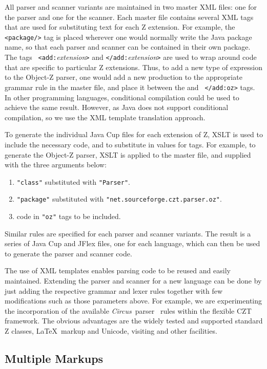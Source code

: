 \documentclass{llncs}
\newcommand{\Circus}{{\sf\slshape Circus}}
\begin{document}
All parser and scanner variants are maintained in two master XML
files: one for the parser and one for the scanner. Each master file
contains several XML tags that are used for substituting text for each
Z extension. For example, the {\tt <package/>} tag is placed wherever
one would normally write the Java package name, so that each parser
and scanner can be contained in their own package. The tags {\tt
<add:}{\em extension}{\tt >} and {\tt </add:}{\em extension}{\tt >}
are used to wrap around code that are specific to particular Z
extensions. Thus, to add a new type of expression to the Object-Z parser,
one would add a new production to the appropriate grammar rule in the
master file, and place it between the {\tt <add:oz>} and {\tt
</add:oz>} tags. In other programming languages, conditional compilation
could be used to achieve the same result. However, as Java does not
support conditional compilation, so we use the XML template translation
approach.

To generate the individual Java Cup files for each extension of Z,
XSLT is used to include the necessary code, and to substitute in
values for tags. For example, to generate the Object-Z parser, XSLT is
applied to the master file, and supplied with the three arguments
below:
\begin{enumerate}
  \item {\tt "class"} substituted with {\tt "Parser"}.
  \item {\tt "package"} substituted with {\tt "net.sourceforge.czt.parser.oz"}.
  \item code in {\tt "oz"} tags to be included.
\end{enumerate}

Similar rules are specified for each parser and scanner variants. The
result is a series of Java Cup and JFlex files, one for each language,
which can then be used to generate the parser and scanner code.

The use of XML templates enables parsing code to be reused and easily
maintained.  Extending the parser and scanner for a new language can
be done by just adding the respective grammar and lexer rules together
with few modifications such as those parameters above.  For example,
we are experimenting the incorporation of the available \Circus\
parser~\cite{circus.other:parser} rules within the flexible CZT
framework. The obvious advantages are the widely tested and supported
standard Z classes, \LaTeX\ markup and Unicode, visiting and other
facilities.

\subsection{Multiple Markups}\label{multiple-markups}
\end{document}
